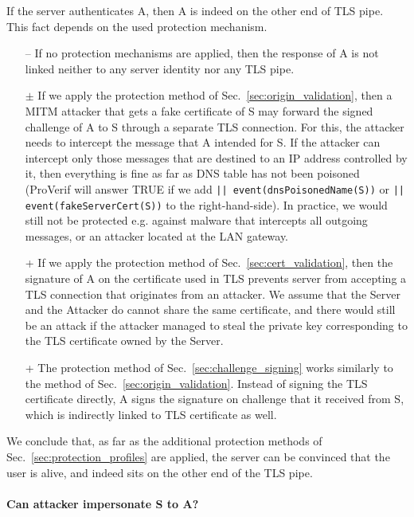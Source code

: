 \begin{itemize}
If the server authenticates A, then A is indeed on the other end of TLS pipe. This fact depends on the used protection mechanism.
\begin{itemize}
\item[--] If no protection mechanisms are applied, then the response of A is not linked neither to any server identity nor any TLS pipe.
\item[$\pm$] If we apply the protection method of Sec.~\ref{sec:origin_validation}, then a MITM attacker that gets a fake certificate of S may forward the signed challenge of A to S through a separate TLS connection. For this, the attacker needs to intercept the message that A intended for S. If the attacker can intercept only those messages that are destined to an IP address controlled by it, then everything is fine as far as DNS table has not been poisoned (ProVerif will answer TRUE if we add \texttt{|| event(dnsPoisonedName(S))} or \texttt{|| event(fakeServerCert(S))} to the right-hand-side). In practice, we would still not be protected e.g. against malware that intercepts all outgoing messages, or an attacker located at the LAN gateway.
\item[+] If we apply the protection method of Sec.~\ref{sec:cert_validation}, then the signature of A on the certificate used in TLS prevents server from accepting a TLS connection that originates from an attacker. We assume that the Server and the Attacker do cannot share the same certificate, and there would still be an attack if the attacker managed to steal the private key corresponding to the TLS certificate owned by the Server.
\item[+] The protection method of Sec.~\ref{sec:challenge_signing} works similarly to the method of Sec.~\ref{sec:origin_validation}. Instead of signing the TLS certificate directly, A signs the signature on challenge that it received from S, which is indirectly linked to TLS certificate as well.
\end{itemize}

\end{itemize}

We conclude that, as far as the additional protection methods of Sec.~\ref{sec:protection_profiles} are applied, the server can be convinced that the user is alive, and indeed sits on the other end of the TLS pipe.

\paragraph{Can attacker impersonate S to A?}

